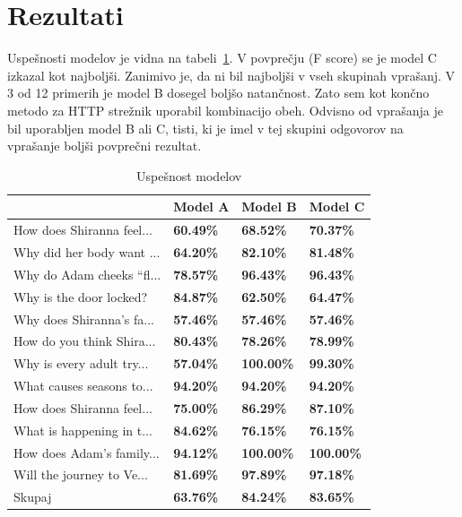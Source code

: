 \documentclass[journal]{IEEEtran}
\begin{document}
\section{Rezultati}
Uspešnosti modelov je vidna na tabeli~\ref{t:mod}. V povprečju (F score) se je model C izkazal kot najboljši. Zanimivo je, da ni bil najboljši v vseh skupinah vprašanj. V 3 od 12 primerih je model B dosegel boljšo natančnost. Zato sem kot končno metodo za HTTP strežnik uporabil kombinacijo obeh. Odvisno od vprašanja je bil uporabljen model B ali C, tisti, ki je imel v tej skupini odgovorov na vprašanje boljši povprečni rezultat.

\begin{table}[]
	\begin{tabular}{l|l|l|l|}
		\cline{2-4}
		                            & Model A          & Model B          & Model C          \\ \hline
	
	
	\multicolumn{1}{|l|}{How does Shiranna feel...} & \textbf{60.49\%} & \textbf{68.52\%} & \textbf{70.37\%} \\ \hline
	\multicolumn{1}{|l|}{Why did her body want ...} & \textbf{64.20\%} & \textbf{82.10\%} & \textbf{81.48\%} \\ \hline
	\multicolumn{1}{|l|}{Why do Adam cheeks “fl...} & \textbf{78.57\%} & \textbf{96.43\%} & \textbf{96.43\%} \\ \hline
	\multicolumn{1}{|l|}{Why is the door locked?} & \textbf{84.87\%} & \textbf{62.50\%} & \textbf{64.47\%} \\ \hline
	\multicolumn{1}{|l|}{Why does Shiranna’s fa...} & \textbf{57.46\%} & \textbf{57.46\%} & \textbf{57.46\%} \\ \hline
	\multicolumn{1}{|l|}{How do you think Shira...} & \textbf{80.43\%} & \textbf{78.26\%} & \textbf{78.99\%} \\ \hline
	\multicolumn{1}{|l|}{Why is every adult try...} & \textbf{57.04\%} & \textbf{100.00\%} & \textbf{99.30\%} \\ \hline
	\multicolumn{1}{|l|}{What causes seasons to...} & \textbf{94.20\%} & \textbf{94.20\%} & \textbf{94.20\%} \\ \hline
	\multicolumn{1}{|l|}{How does Shiranna feel...} & \textbf{75.00\%} & \textbf{86.29\%} & \textbf{87.10\%} \\ \hline
	\multicolumn{1}{|l|}{What is happening in t...} & \textbf{84.62\%} & \textbf{76.15\%} & \textbf{76.15\%} \\ \hline
	\multicolumn{1}{|l|}{How does Adam’s family...} & \textbf{94.12\%} & \textbf{100.00\%} & \textbf{100.00\%} \\ \hline
	\multicolumn{1}{|l|}{Will the journey to Ve...} & \textbf{81.69\%} & \textbf{97.89\%} & \textbf{97.18\%} \\ \hline
	\multicolumn{1}{|l|}{Skupaj} & \textbf{63.76\%} & \textbf{84.24\%} & \textbf{83.65\%} \\ \hline
		
		
		
	\end{tabular}
	\caption{Uspešnost modelov}
	\label{t:mod}
\end{table}
\end{document}
